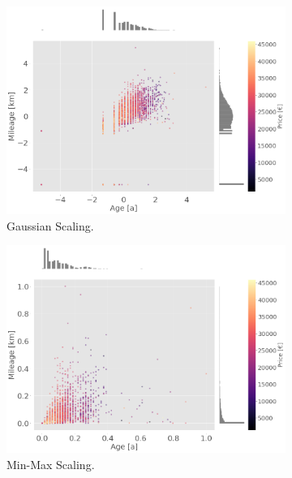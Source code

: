 \begin{figure}
\begin{subfigure}[b]{0.48\textwidth}
        \includegraphics[width=\textwidth]{"content/pics/Scatter_Normal.png"}
        \caption{Gaussian Scaling.}
    \end{subfigure}
    \hfill
    \begin{subfigure}[b]{0.48\textwidth}
        \centering
        \includegraphics[width=\textwidth]{"content/pics/Scatter_MinMax.png"}
        \caption{Min-Max Scaling.}
    \end{subfigure}
    \vfill 
    \begin{subfigure}[b]{0.48\textwidth}
        \centering

\end{subfigure}
\end{figure}

